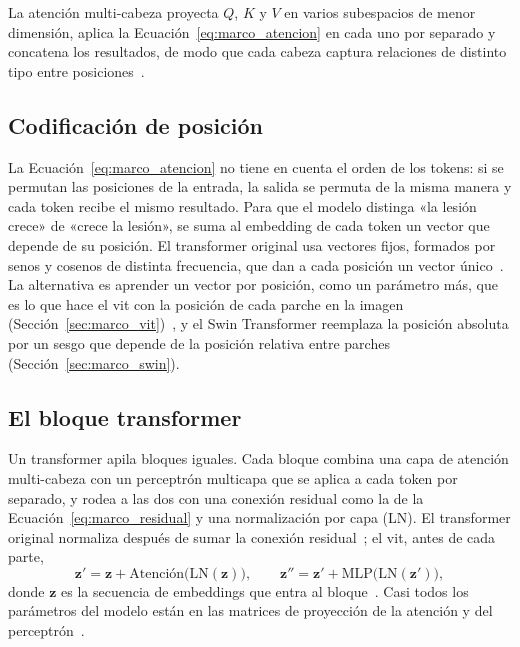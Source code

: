 

La atención multi-cabeza proyecta $Q$, $K$ y $V$ en varios subespacios de menor dimensión, aplica
la Ecuación~\ref{eq:marco_atencion} en cada uno por separado y concatena los resultados, de modo que cada
cabeza captura relaciones de distinto tipo entre posiciones~\cite{vaswani2017attention}.

\subsection{Codificación de posición}
\label{sec:marco_posicion}

La Ecuación~\ref{eq:marco_atencion} no tiene en cuenta el orden de los tokens: si se permutan las posiciones de
la entrada, la salida se permuta de la misma manera y cada token recibe el mismo resultado. Para que el modelo
distinga «la lesión crece» de «crece la lesión», se suma al embedding de cada token un vector que depende de su
posición. El transformer original usa vectores fijos, formados por senos y cosenos de distinta frecuencia,
que dan a cada posición un vector único~\cite{vaswani2017attention}. La alternativa es aprender un vector por
posición, como un parámetro más, que es lo que hace el \gls{vit} con la posición de cada parche en la imagen
(Sección~\ref{sec:marco_vit})~\cite{dosovitskiy2021image}, y el Swin Transformer reemplaza la posición absoluta
por un sesgo que depende de la posición relativa entre parches (Sección~\ref{sec:marco_swin}).

\subsection{El bloque transformer}
\label{sec:marco_bloque_transformer}

Un transformer apila bloques iguales. Cada bloque combina una capa de atención multi-cabeza con un perceptrón
multicapa que se aplica a cada token por separado, y rodea a las dos con una conexión residual como la de la
Ecuación~\ref{eq:marco_residual} y una normalización por capa (LN). El transformer original normaliza después
de sumar la conexión residual~\cite{vaswani2017attention}; el \gls{vit}, antes de cada parte,
\begin{equation}
    \mathbf{z}' = \mathbf{z} + \mathrm{Atención}\bigl(\mathrm{LN}(\mathbf{z})\bigr), \qquad
    \mathbf{z}'' = \mathbf{z}' + \mathrm{MLP}\bigl(\mathrm{LN}(\mathbf{z}')\bigr),
    \label{eq:marco_bloque}
\end{equation}
donde $\mathbf{z}$ es la secuencia de embeddings que entra al bloque~\cite{dosovitskiy2021image}. Casi todos
los parámetros del modelo están en las matrices de proyección de la atención y del perceptrón~\cite{kaplan2020scaling}.


